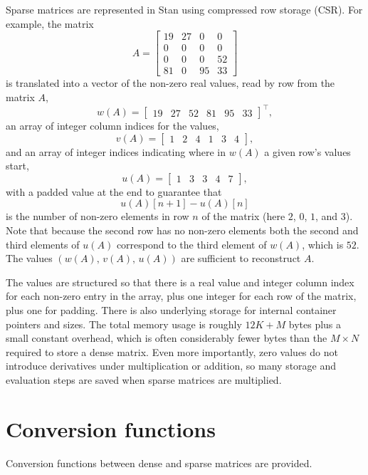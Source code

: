 \documentclass[
  10pt,
]{book}
\begin{document}
Sparse matrices are represented in Stan using compressed row storage
(CSR). For example, the matrix \[ A = \begin{bmatrix} 19 & 27 & 0 & 0
\\ 0 & 0 & 0 & 0 \\ 0 & 0 & 0 & 52 \\ 81 & 0 & 95 & 33 \end{bmatrix}
\] is translated into a vector of the non-zero real values, read by
row from the matrix \(A\), \[ w(A) = \begin{bmatrix} 19 & 27 & 52 & 81 &
95 & 33 \end{bmatrix}^{\top} \! \! \! , \] an array of integer column
indices for the values, \[ v(A) = \begin{bmatrix} 1 & 2 & 4 & 1 & 3 &
4 \end{bmatrix} \! , \] and an array of integer indices indicating
where in \(w(A)\) a given row's values start, \[ u(A) = \begin{bmatrix}
1 & 3 & 3 & 4 & 7 \end{bmatrix} \! , \] with a padded value at the end
to guarantee that \[ u(A)[n+1] - u(A)[n] \] is the number of non-zero
elements in row \(n\) of the matrix (here \(2\), \(0\), \(1\), and \(3\)). Note
that because the second row has no non-zero elements both the second
and third elements of \(u(A)\) correspond to the third element of
\(w(A)\), which is \(52\). The values \((w(A), \, v(A), \, u(A))\) are
sufficient to reconstruct \(A\).

The values are structured so that there is a real value and integer
column index for each non-zero entry in the array, plus one integer
for each row of the matrix, plus one for padding. There is also
underlying storage for internal container pointers and sizes. The
total memory usage is roughly \(12 K + M\) bytes plus a small constant
overhead, which is often considerably fewer bytes than the \(M \times N\) required to store a dense matrix. Even more importantly, zero
values do not introduce derivatives under multiplication or addition,
so many storage and evaluation steps are saved when sparse matrices
are multiplied.

\hypertarget{conversion-functions}{%
\section{Conversion functions}\label{conversion-functions}}

Conversion functions between dense and sparse matrices are provided.
\end{document}
